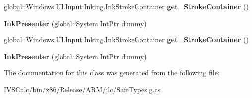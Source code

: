 \begin{DoxyCompactItemize}
global\+::\+Windows.\+U\+I.\+Input.\+Inking.\+Ink\+Stroke\+Container {\bfseries get\+\_\+\+Stroke\+Container} ()
\item 
\mbox{\label{class_windows_1_1_u_i_1_1_input_1_1_inking_1_1_ink_presenter_a8f62c1e56a7b0648868048c4cd558bb7}} 
{\bfseries Ink\+Presenter} (global\+::\+System.\+Int\+Ptr dummy)
\item 
\mbox{\label{class_windows_1_1_u_i_1_1_input_1_1_inking_1_1_ink_presenter_a0b0a4db8e32f2ac6019668c2dbba7165}} 
global\+::\+Windows.\+U\+I.\+Input.\+Inking.\+Ink\+Stroke\+Container {\bfseries get\+\_\+\+Stroke\+Container} ()
\item 
\mbox{\label{class_windows_1_1_u_i_1_1_input_1_1_inking_1_1_ink_presenter_a8f62c1e56a7b0648868048c4cd558bb7}} 
{\bfseries Ink\+Presenter} (global\+::\+System.\+Int\+Ptr dummy)
\end{DoxyCompactItemize}


The documentation for this class was generated from the following file\+:\begin{DoxyCompactItemize}
\item 
I\+V\+S\+Calc/bin/x86/\+Release/\+A\+R\+M/ilc/Safe\+Types.\+g.\+cs\end{DoxyCompactItemize}
